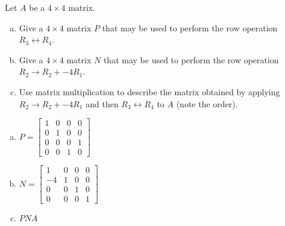 
\begin{exerciseStatement}


Let \(A\) be a \(4 \times 4\) matrix.


\begin{enumerate}[(a)]
\item Give a \(4 \times 4\) matrix \(P\) that may be used to perform the row operation \( R_3 \leftrightarrow R_4 \).
\item Give a \(4 \times 4\) matrix \(N\) that may be used to perform the row operation \( R_2 \to R_2 + -4R_1 \).
\item Use matrix multiplication to describe the matrix obtained by applying \( R_2 \to R_2 + -4R_1 \) and then \( R_3 \leftrightarrow R_4 \) to \(A\) (note the order). 
\end{enumerate}
    
\end{exerciseStatement}
    
\begin{exerciseAnswer} 

\begin{enumerate}[(a)]
\item \(P= \left[\begin{array}{cccc}
1 & 0 & 0 & 0 \\
0 & 1 & 0 & 0 \\
0 & 0 & 0 & 1 \\
0 & 0 & 1 & 0
\end{array}\right] \)
\item \(N= \left[\begin{array}{cccc}
1 & 0 & 0 & 0 \\
-4 & 1 & 0 & 0 \\
0 & 0 & 1 & 0 \\
0 & 0 & 0 & 1
\end{array}\right] \)
\item \(PNA\)
\end{enumerate}
    
\end{exerciseAnswer}
    
